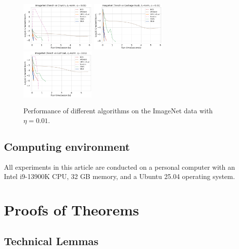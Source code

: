 \documentclass{article}
\theoremstyle{plain}
\theoremstyle{definition}
\theoremstyle{remark}
\begin{document}
\begin{figure}[p]
    \centering
    \includegraphics[width=0.33\textwidth]{save/ImageNet - Extra/run_times/CLASS1=tench, CLASS2=church, dim=30, norm=l1, reg=0.01}
    \includegraphics[width=0.33\textwidth]{save/ImageNet - Extra/run_times/CLASS1=tench, CLASS2=garbage truck, dim=30, norm=l1, reg=0.01}
    \includegraphics[width=0.33\textwidth]{save/ImageNet - Extra/run_times/CLASS1=tench, CLASS2=golf ball, dim=30, norm=l1, reg=0.01}
    \caption{Performance of different algorithms on the ImageNet data with $\eta=0.01$.}
    \label{fig:imagenet_eta_0.01}
\end{figure}

\subsection{Computing environment}

All experiments in this article are conducted on a personal computer with an Intel i9-13900K CPU, 32 GB memory, and a Ubuntu 25.04 operating system.

\newpage

\section{Proofs of Theorems}
\subsection{Technical Lemmas}
\end{document}
